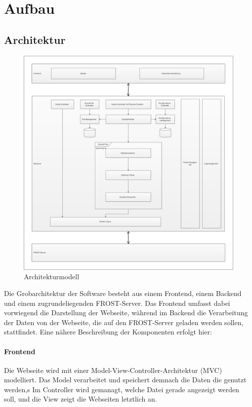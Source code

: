 \section{Aufbau}

\subsection{Architektur}
\begin{figure}[htbp]
\centering
\includegraphics[scale=0.44]{uml/architektur.eps}
\caption{\label{fig:architektur} Architekturmodell}
\end{figure}

Die Grobarchitektur der Software besteht aus einem Frontend, einem Backend und einem zugrundeliegenden FROST-Server. Das Frontend umfasst dabei vorwiegend die Darstellung der Webseite, während im Backend die Verarbeitung der Daten von der Webseite, die auf den FROST-Server geladen werden sollen, stattfindet. Eine nähere Beschreibung der Komponenten erfolgt hier:

\paragraph{Frontend}
Die Webseite wird mit einer Model-View-Controller-Architektur (MVC) modelliert.
Das Model verarbeitet und speichert demnach die Daten die genutzt werden,s
Im Controller wird gemanagt, welche Datei gerade angezeigt werden soll, und die View zeigt die Webseiten letztlich an.

